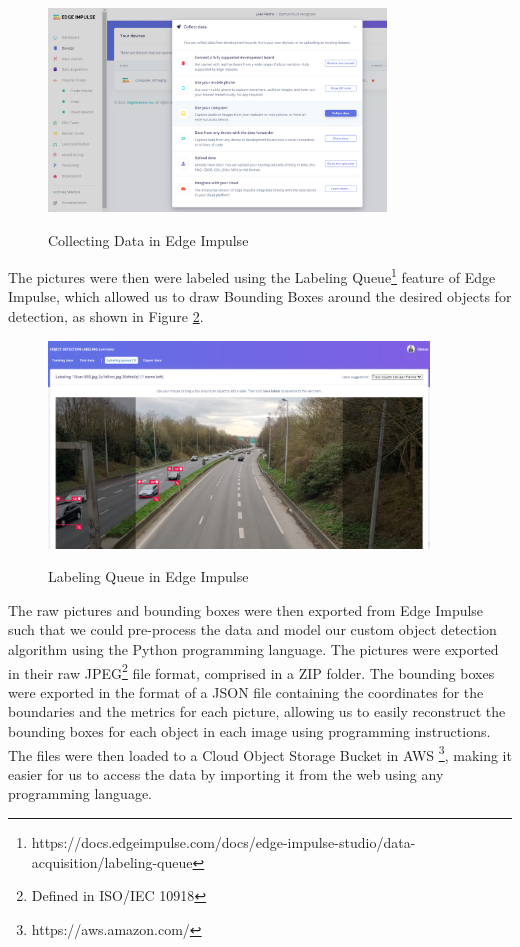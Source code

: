 \begin{figure}[H]
	\centering
	\caption[Collecting Data in Edge Impulse]{Collecting Data in Edge Impulse}
    \includegraphics[width=0.8\textwidth]{./images/edge-impulse-collect-data.png}
    \label{fig:edgeimpulse1}
\end{figure}

The pictures were then were labeled using the Labeling
Queue\footnote{https://docs.edgeimpulse.com/docs/edge-impulse-studio/data-acquisition/labeling-queue}
feature of Edge Impulse, which allowed us to draw Bounding Boxes around the
desired objects for detection, as shown in Figure \ref{fig:edgeimpulse2}.

\begin{figure}[H]
	\centering
	\caption[Labelling Queue in Edge Impulse]{Labeling Queue in Edge Impulse}
    \includegraphics[width=0.9\textwidth]{./images/edge-impulse-labelling-queue.png}
    \label{fig:edgeimpulse2}
\end{figure}

The raw pictures and bounding boxes were then exported from Edge Impulse such
that we could pre-process the data and model our custom object detection
algorithm using the Python programming language. The pictures were exported in
their raw JPEG\footnote{Defined in ISO/IEC 10918}  file format, comprised in a
ZIP folder. The bounding boxes were exported in the format of a JSON file
containing the coordinates for the boundaries and the metrics for each picture,
allowing us to easily reconstruct the bounding boxes for each object in each
image using programming instructions. The files were then loaded to a Cloud
Object Storage Bucket in AWS \footnote{https://aws.amazon.com/}, making it
easier for us to access the data by importing it from the web using any
programming language.

